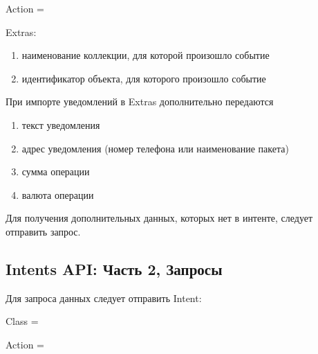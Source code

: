 \documentclass[a4paper,10pt,russian]{sphinxmanual}
\begin{document}
\sphinxAtStartPar
Action = 

\sphinxAtStartPar
Extras:
\begin{enumerate}
%
\item {} 
\sphinxAtStartPar
{} \sphinxhyphen{} наименование коллекции, для которой произошло событие

\item {} 
\sphinxAtStartPar
{} \sphinxhyphen{} идентификатор объекта, для которого произошло событие

\end{enumerate}

\sphinxAtStartPar
При импорте уведомлений в Extras дополнительно передаются
\begin{enumerate}
%
\item {} 
\sphinxAtStartPar
{} \sphinxhyphen{} текст уведомления

\item {} 
\sphinxAtStartPar
{} \sphinxhyphen{} адрес уведомления (номер телефона или наименование пакета)

\item {} 
\sphinxAtStartPar
{} \sphinxhyphen{} сумма операции

\item {} 
\sphinxAtStartPar
{} \sphinxhyphen{} валюта операции

\end{enumerate}

\sphinxAtStartPar
Для получения дополнительных данных, которых нет в интенте, следует отправить запрос.


\subsection{Intents API: Часть 2, Запросы}
\label{\detokenize{api:intents-api-2}}
\sphinxAtStartPar
Для запроса данных следует отправить Intent:

\sphinxAtStartPar
Class = 

\sphinxAtStartPar
Action = 
\end{document}
